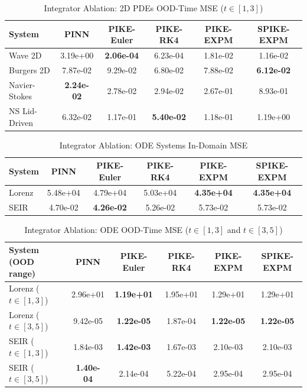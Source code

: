 \documentclass{article}
\theoremstyle{remark}
\begin{document}
\begin{table}[H]
\centering
\caption{Integrator Ablation: 2D PDEs OOD-Time MSE ($t \in [1,3]$)}
\label{tab:integrator_2d_ood_time}
\begin{tabular}{lccccc}
\toprule
System & PINN & PIKE-Euler & PIKE-RK4 & PIKE-EXPM & SPIKE-EXPM \\
\midrule
Wave 2D & 3.19e+00 & \textbf{2.06e-04} & 6.23e-04 & 1.81e-02 & 1.16e-02 \\
Burgers 2D & 7.87e-02 & 9.29e-02 & 6.80e-02 & 7.88e-02 & \textbf{6.12e-02} \\
Navier-Stokes & \textbf{2.24e-02} & 2.78e-02 & 2.94e-02 & 2.67e-01 & 8.93e-01 \\
NS Lid-Driven & 6.32e-02 & 1.17e-01 & \textbf{5.40e-02} & 1.18e-01 & 1.19e+00 \\
\bottomrule
\end{tabular}
\end{table}

\begin{table}[H]
\centering
\caption{Integrator Ablation: ODE Systems In-Domain MSE}
\label{tab:integrator_ode}
\begin{tabular}{lccccc}
\toprule
System & PINN & PIKE-Euler & PIKE-RK4 & PIKE-EXPM & SPIKE-EXPM \\
\midrule
Lorenz & 5.48e+04 & 4.79e+04 & 5.03e+04 & \textbf{4.35e+04} & \textbf{4.35e+04} \\
SEIR & 4.70e-02 & \textbf{4.26e-02} & 5.26e-02 & 5.73e-02 & 5.73e-02 \\
\bottomrule
\end{tabular}
\end{table}

\begin{table}[H]
\centering
\caption{Integrator Ablation: ODE OOD-Time MSE ($t \in [1,3]$ and $t \in [3,5]$)}
\label{tab:integrator_ode_ood}
\begin{tabular}{lccccc}
\toprule
System (OOD range) & PINN & PIKE-Euler & PIKE-RK4 & PIKE-EXPM & SPIKE-EXPM \\
\midrule
Lorenz ($t \in [1,3]$) & 2.96e+01 & \textbf{1.19e+01} & 1.95e+01 & 1.29e+01 & 1.29e+01 \\
Lorenz ($t \in [3,5]$) & 9.42e-05 & \textbf{1.22e-05} & 1.87e-04 & \textbf{1.22e-05} & \textbf{1.22e-05} \\
SEIR ($t \in [1,3]$) & 1.84e-03 & \textbf{1.42e-03} & 1.67e-03 & 2.10e-03 & 2.10e-03 \\
SEIR ($t \in [3,5]$) & \textbf{1.40e-04} & 2.14e-04 & 5.22e-04 & 2.95e-04 & 2.95e-04 \\
\bottomrule
\end{tabular}
\end{table}
\end{document}
